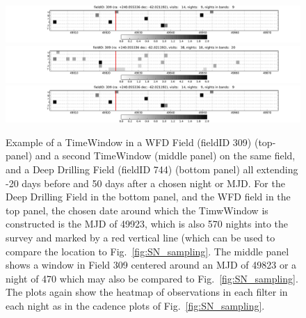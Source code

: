  \begin{center}
\begin{figure}
 \includegraphics[width=\textwidth]{figs/supernova/TimeWindow_309_49923.pdf}
 \includegraphics[width=\textwidth]{figs/supernova/TimeWindow_309_49823.pdf}
 \includegraphics[width=\textwidth]{figs/supernova/TimeWindow_744_49923.pdf}
 \label{fig:TimeWindow}
 \caption{Example of a TimeWindow in a WFD Field (fieldID 309) (top-panel) and a second TimeWindow (middle panel) on the same field, and a Deep Drilling Field (fieldID 744) (bottom panel) all extending -20 days before and 50 days after a chosen night or MJD. For the Deep Drilling Field in the bottom panel, and the WFD field in the top  panel, the chosen date around which the TimwWindow is constructed is the MJD of 49923, which is also 570 nights into the survey and marked by a red vertical line (which can be used to compare the location to Fig.~\ref{fig:SN_sampling}. The middle panel shows a window in Field 309 centered around an MJD of 49823 or a night of 470 which may also be compared to Fig.~\ref{fig:SN_sampling}. The plots again show the heatmap of observations in each filter in each night as in the cadence plots of Fig.~\ref{fig:SN_sampling}.}
\end{figure}
 \end{center}


